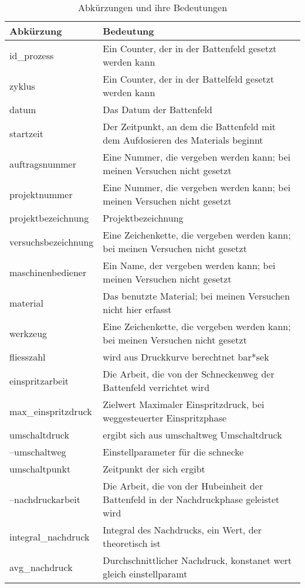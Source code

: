 

\begin{longtable}{|p{4cm}|p{10cm}|}
  \caption{Abkürzungen und ihre Bedeutungen} \\
  \hline
  \textbf{Abkürzung} & \textbf{Bedeutung} \\
  \hline
  \endhead
  id\_prozess & Ein Counter, der in der Battenfeld gesetzt werden kann \\
  zyklus & Ein Counter, der in der Battelfeld gesetzt werden kann \\
  datum & Das Datum der Battenfeld \\
  startzeit & Der Zeitpunkt, an dem die Battenfeld mit dem Aufdosieren des Materials beginnt \\
  auftragsnummer & Eine Nummer, die vergeben werden kann; bei meinen Versuchen nicht gesetzt \\
  projektnummer & Eine Nummer, die vergeben werden kann; bei meinen Versuchen nicht gesetzt \\
  projektbezeichnung & Projektbezeichnung \\
  versuchsbezeichnung & Eine Zeichenkette, die vergeben werden kann; bei meinen Versuchen nicht gesetzt \\
  maschinenbediener & Ein Name, der vergeben werden kann; bei meinen Versuchen nicht gesetzt \\
  material & Das benutzte Material; bei meinen Versuchen nicht hier erfasst \\
  werkzeug & Eine Zeichenkette, die vergeben werden kann; bei meinen Versuchen nicht gesetzt \\
  fliesszahl & wird aus Druckkurve berechtnet bar*sek\\
  einspritzarbeit & Die Arbeit, die von der Schneckenweg der Battenfeld verrichtet wird \\
  max\_einspritzdruck & Zielwert Maximaler Einspritzdruck, bei weggesteuerter Einspritzphase \\
  umschaltdruck & ergibt sich aus umschaltweg Umschaltdruck \\
  --umschaltweg & Einstellparameter für die schnecke\\
  umschaltpunkt & Zeitpunkt der sich ergibt\\
  --nachdruckarbeit & Die Arbeit, die von der Hubeinheit der Battenfeld in der Nachdruckphase geleistet wird \\
  integral\_nachdruck & Integral des Nachdrucks, ein Wert, der theoretisch ist \\
  avg\_nachdruck & Durchschnittlicher Nachdruck, konstanet wert gleich einstellparamt \\

\end{longtable}
